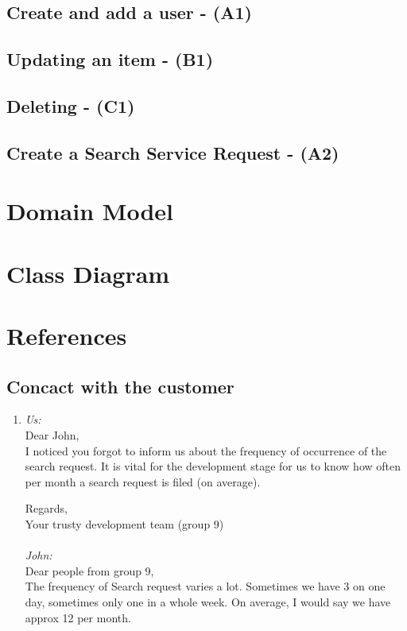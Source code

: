 \documentclass{article}
\begin{document}
\subsection{Create and add a user - (A1)}


\subsection{Updating an item - (B1)}



\subsection{Deleting - (C1)}


\subsection{Create a Search Service Request - (A2)}



\section{Domain Model}

\section{Class Diagram}
\section{References}
\subsection*{Concact with the customer}
\begin{enumerate}[1.]
	\item \label{conv1}\textsl{Us:}\\
	Dear John,\\

I noticed you forgot to inform us about the frequency of occurrence of the search request. It is vital for the development stage for us to know how often per month a search request is filed (on average).

Regards,\\
Your trusty development team (group 9)\\
\vspace{10pt}\\
\textsl{John:}\\
Dear people from group 9,\\

The frequency of Search request varies a lot. Sometimes we have 3 on one day, sometimes only one in a whole week. On average, I would say we have approx 12 per month.
\end{enumerate}
\end{document}

